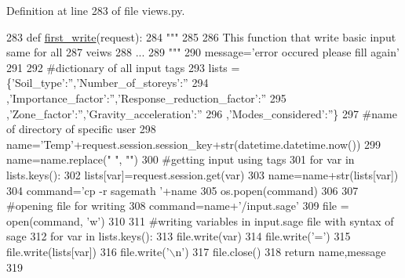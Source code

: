 Definition at line 283 of file views.\+py.


\begin{DoxyCode}
283 \textcolor{keyword}{def }\hyperlink{namespacecivilsage_1_1views_ad9397359f36a9df37e0aa43f3be032a3}{first\_write}(request):
284     \textcolor{stringliteral}{"""}
285 \textcolor{stringliteral}{}
286 \textcolor{stringliteral}{    This function that write basic input same for all}
287 \textcolor{stringliteral}{    veiws}
288 \textcolor{stringliteral}{    ...}
289 \textcolor{stringliteral}{    """}
290     message=\textcolor{stringliteral}{'error occured please fill again'}
291 
292     \textcolor{comment}{#dictionary of all input tags}
293     lists = \{\textcolor{stringliteral}{'Soil\_type'}:\textcolor{stringliteral}{''},\textcolor{stringliteral}{'Number\_of\_storeys'}:\textcolor{stringliteral}{''}
294     ,\textcolor{stringliteral}{'Importance\_factor'}:\textcolor{stringliteral}{''},\textcolor{stringliteral}{'Response\_reduction\_factor'}:\textcolor{stringliteral}{''}
295     ,\textcolor{stringliteral}{'Zone\_factor'}:\textcolor{stringliteral}{''},\textcolor{stringliteral}{'Gravity\_acceleration'}:\textcolor{stringliteral}{''}
296     ,\textcolor{stringliteral}{'Modes\_considered'}:\textcolor{stringliteral}{''}\}
297     \textcolor{comment}{#name of directory of specific user}
298     name=\textcolor{stringliteral}{'Temp'}+request.session.session\_key+str(datetime.datetime.now())
299     name=name.replace(\textcolor{stringliteral}{" "}, \textcolor{stringliteral}{""})
300     \textcolor{comment}{#getting input using tags}
301     \textcolor{keywordflow}{for} var \textcolor{keywordflow}{in} lists.keys():
302         lists[var]=request.session.get(var)
303         name=name+str(lists[var])
304     command=\textcolor{stringliteral}{'cp -r sagemath '}+name
305     os.popen(command)
306 
307     \textcolor{comment}{#opening file for writing}
308     command=name+\textcolor{stringliteral}{'/input.sage'}
309     file = open(command, \textcolor{stringliteral}{'w'})
310 
311     \textcolor{comment}{#writing variables in input.sage file with syntax of sage}
312     \textcolor{keywordflow}{for} var \textcolor{keywordflow}{in} lists.keys():
313         file.write(var)
314         file.write(\textcolor{stringliteral}{'='})
315         file.write(lists[var])
316         file.write(\textcolor{stringliteral}{'\(\backslash\)n'})
317     file.close()
318     \textcolor{keywordflow}{return} name,message
319 \end{DoxyCode}


